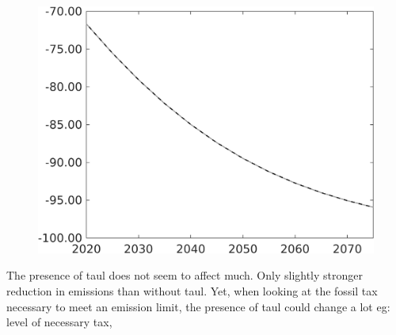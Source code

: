 \documentclass[12pt]{article}
\begin{document}
\begin{figure}[h!!]
\begin{minipage}[]{0.32\textwidth}
\end{minipage}	
\begin{minipage}[]{0.32\textwidth}
\includegraphics[width=1\textwidth]{../../codding_model/own_basedOnFried/optimalPol_010922_revision/figures/all_13Sept22/PerdifNoTauf_Equlab_regime0_CompTaul_pgpftf_spillover0_nsk1_xgr1_knspil1_sep1_LFlimit0_emsbase0_countec0_GovRev0_etaa0.79_lgd0.png}
\end{minipage}	
\end{figure}
The presence of taul does not seem to affect much. Only slightly stronger reduction in emissions than without taul. Yet, when looking at the fossil tax necessary to meet an emission limit, the presence of taul could change a lot eg: level of necessary tax, 
\clearpage
\newpage 
\end{document}
